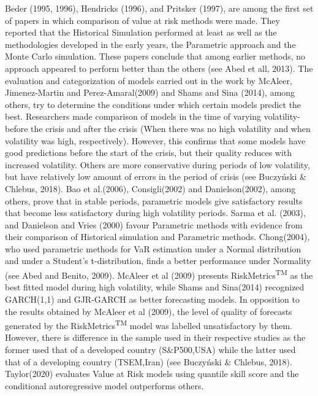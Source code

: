 \documentclass[a4paper,11pt,oneside]{book}
\begin{document}
Beder (1995, 1996), Hendricks (1996), and
Pritsker (1997), are among the first set of papers in which comparison of value at risk methods were made. They reported that the Historical Simulation performed at least as well as the methodologies developed in the early years, the Parametric approach and the Monte Carlo simulation. These papers conclude that among earlier methods, no approach appeared to perform better than the
others (see Abed et all, 2013). The evaluation and categorization of models carried out in the work by McAleer, Jimenez-Martin and Perez-Amaral(2009) and Shams and Sina (2014), among others, try to determine the conditions under which certain models predict the best. Researchers made comparison of models in the time of varying volatility-before the crisis and after the crisis (When there was no high volatility and when volatility was high, respectively). However, this confirms that some models have good predictions before the start of the crisis, but their quality reduces with increased volatility. Others are more conservative during periods of low volatility, but have relatively low amount of errors in the period of crisis (see Buczyński \& Chlebus, 2018).
\newline\newline
Bao et al.(2006), Consigli(2002) and Danielson(2002), among
others, prove that in stable periods, parametric models give satisfactory results
that become less satisfactory during high volatility periods. Sarma et al. (2003), and Danielson and Vries (2000) favour Parametric methods with evidence from their comparison of Historical simulation and Parametric methods. Chong(2004),
who used parametric methods for VaR estimation under a Normal distribution and under a
Student’s t-distribution, finds a better performance under Normality (see Abed and Benito, 2009). McAleer et al (2009) presents RiskMetrics\textsuperscript{TM} as
the best fitted model during high volatility, while Shams and Sina(2014) recognized GARCH(1,1) and GJR-GARCH as better
forecasting models. In opposition to the results obtained
by McAleer et al (2009), the level of quality of forecasts
generated by the RiskMetrics\textsuperscript{TM} model was labelled
unsatisfactory by them. However, there is difference in the sample used in their respective studies as the former used that of a developed country (S\&P500,USA) while the latter used that of a developing  country (TSEM,Iran) (see Buczyński \& Chlebus, 2018). Taylor(2020) evaluates Value at Risk models using quantile skill score and the conditional autoregressive model outperforms others.
\end{document}
